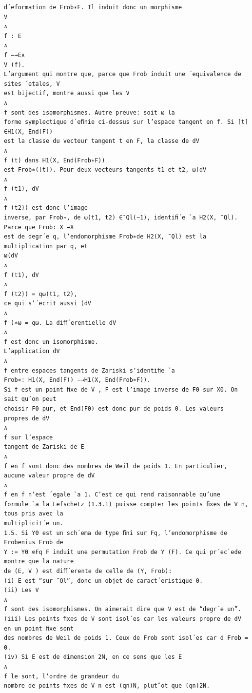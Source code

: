 \documentclass[11pt]{article}
\begin{document}
\begin{Verbatim}[breaklines=true,fontsize=\small]
d´eformation de Frob∗F. Il induit donc un morphisme
V
∧
f : E
∧
f −→E∧
V (f).
L’argument qui montre que, parce que Frob induit une ´equivalence de sites ´etales, V
est bijectif, montre aussi que les V
∧
f sont des isomorphismes. Autre preuve: soit ω la
forme symplectique d´eﬁnie ci-dessus sur l’espace tangent en f. Si [t] ∈H1(X, End(F))
est la classe du vecteur tangent t en F, la classe de dV
∧
f (t) dans H1(X, End(Frob∗F))
est Frob∗([t]). Pour deux vecteurs tangents t1 et t2, ω(dV
∧
f (t1), dV
∧
f (t2)) est donc l’image
inverse, par Frob∗, de ω(t1, t2) ∈¯Ql(−1), identiﬁ´e `a H2(X, ¯Ql). Parce que Frob: X →X
est de degr´e q, l’endomorphisme Frob∗de H2(X, ¯Ql) est la multiplication par q, et
ω(dV
∧
f (t1), dV
∧
f (t2)) = qω(t1, t2),
ce qui s’´ecrit aussi (dV
∧
f )∗ω = qω. La diﬀ´erentielle dV
∧
f est donc un isomorphisme.
L’application dV
∧
f entre espaces tangents de Zariski s’identiﬁe `a
Frob∗: H1(X, End(F)) −→H1(X, End(Frob∗F)).
Si f est un point ﬁxe de V , F est l’image inverse de F0 sur X0. On sait qu’on peut
choisir F0 pur, et End(F0) est donc pur de poids 0. Les valeurs propres de dV
∧
f sur l’espace
tangent de Zariski de E
∧
f en f sont donc des nombres de Weil de poids 1. En particulier,
aucune valeur propre de dV
∧
f en f n’est ´egale `a 1. C’est ce qui rend raisonnable qu’une
formule `a la Lefschetz (1.3.1) puisse compter les points ﬁxes de V n, tous pris avec la
multiplicit´e un.
1.5. Si Y0 est un sch´ema de type ﬁni sur Fq, l’endomorphisme de Frobenius Frob de
Y := Y0 ⊗Fq F induit une permutation Frob de Y (F). Ce qui pr´ec`ede montre que la nature
de (E, V ) est diﬀ´erente de celle de (Y, Frob):
(i) E est “sur ¯Ql”, donc un objet de caract´eristique 0.
(ii) Les V
∧
f sont des isomorphismes. On aimerait dire que V est de “degr´e un”.
(iii) Les points ﬁxes de V sont isol´es car les valeurs propre de dV en un point ﬁxe sont
des nombres de Weil de poids 1. Ceux de Frob sont isol´es car d Frob = 0.
(iv) Si E est de dimension 2N, en ce sens que les E
∧
f le sont, l’ordre de grandeur du
nombre de points ﬁxes de V n est (qn)N, plutˆot que (qn)2N.


\end{Verbatim}
\end{document}
